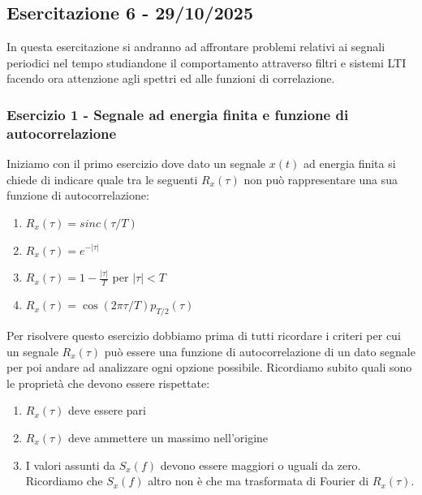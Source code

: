 \documentclass[../main.tex]{subfiles}
\begin{document}
\clearpage
\thispagestyle{empty}
\vspace*{7cm}
\subsection{Esercitazione 6 - 29/10/2025}
\vspace*{1.5cm}




In questa esercitazione si andranno ad affrontare problemi relativi ai segnali periodici nel tempo studiandone il comportamento attraverso filtri e sistemi LTI facendo ora attenzione agli spettri ed alle funzioni di correlazione. 

\subsubsection{Esercizio 1 - Segnale ad energia finita e funzione di autocorrelazione}

Iniziamo con il primo esercizio dove dato un segnale $x(t)$ ad energia finita si chiede di indicare quale tra le seguenti $R_x(\tau)$ non può rappresentare una sua funzione di autocorrelazione:


\begin{enumerate}
	\item[\textbf{a)}] $R_x(\tau) = \unit{sinc}(\tau / T) $
	\item[\textbf{b)}] $R_x(\tau) = e^{-|\tau|}$
	\item[\textbf{c)}] $R_x(\tau) = 1 - \frac{|\tau|}{T}$ per $|\tau| < T$
	\item[\textbf{d)}] $R_x(\tau) = \cos(2\pi \tau / T ) p_{T/2}(\tau)$
\end{enumerate}

Per risolvere questo esercizio dobbiamo prima di tutti ricordare i criteri per cui un segnale $R_x(\tau)$ può essere una funzione di autocorrelazione di un dato segnale per poi andare ad analizzare ogni opzione possibile.
Ricordiamo subito quali sono le proprietà che devono essere rispettate:

\begin{enumerate}
	\item[\textbf{-}] $R_x(\tau)$ deve essere pari
	\item[\textbf{-}] $R_x(\tau)$ deve ammettere un massimo nell'origine
	\item[\textbf{-}] I valori assunti da $S_x(f)$ devono essere maggiori o uguali da zero. Ricordiamo che $S_x(f)$ altro non è che ma trasformata di Fourier di $R_x(\tau)$.
\end{enumerate}
\end{document}
